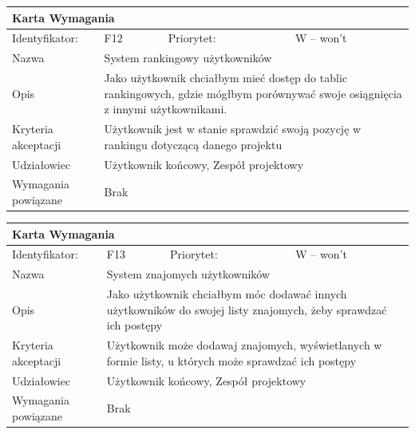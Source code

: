 \documentclass[a4paper,11pt]{report}
\begin{document}
		\newline
		\vspace*{0,2 cm}
		\newline
		\begin{tabular}{|p{3cm}|p{2cm}|p{2cm}|p{6cm}|}
		\hline
		\multicolumn{4}{|p{12 cm}|}{Karta Wymagania}\\
		\hline
		Identyfikator: & F12 & Priorytet: & W – won't\\
		\hline
		Nazwa & \multicolumn{3}{|p{10 cm}|}{System rankingowy użytkowników}\\
		\hline
		Opis & \multicolumn{3}{|p{10 cm}|}{Jako użytkownik chciałbym mieć dostęp do tablic rankingowych, gdzie mógłbym porównywać swoje osiągnięcia z innymi użytkownikami.}\\
		\hline
		Kryteria akceptacji & \multicolumn{3}{|p{10 cm}|}{Użytkownik jest w stanie sprawdzić swoją pozycję w rankingu dotyczącą danego projektu}\\
		\hline
		Udziałowiec & \multicolumn{3}{|p{10 cm}|}{Użytkownik końcowy, Zespół projektowy}\\
		\hline
		Wymagania powiązane & \multicolumn{3}{|p{10 cm}|}{Brak}\\
		\hline
		\end{tabular}
		\newline
		\vspace*{0,2 cm}
		\newline
		\begin{tabular}{|p{3cm}|p{2cm}|p{2cm}|p{6cm}|}
		\hline
		\multicolumn{4}{|p{12 cm}|}{Karta Wymagania}\\
		\hline
		Identyfikator: & F13 & Priorytet: & W – won't \\
		\hline
		Nazwa & \multicolumn{3}{|p{10 cm}|}{System znajomych użytkowników}\\
		\hline
		Opis & \multicolumn{3}{|p{10 cm}|}{Jako użytkownik chciałbym móc dodawać innych użytkowników do swojej listy znajomych, żeby sprawdzać ich postępy}\\
		\hline
		Kryteria akceptacji & \multicolumn{3}{|p{10 cm}|}{Użytkownik może dodawaj znajomych, wyświetlanych w formie listy, u których może sprawdzać ich postępy}\\
		\hline
		Udziałowiec & \multicolumn{3}{|p{10 cm}|}{Użytkownik końcowy, Zespół projektowy}\\
		\hline
		Wymagania powiązane & \multicolumn{3}{|p{10 cm}|}{Brak}\\
		\hline
		\end{tabular}
		\newline
\end{document}
